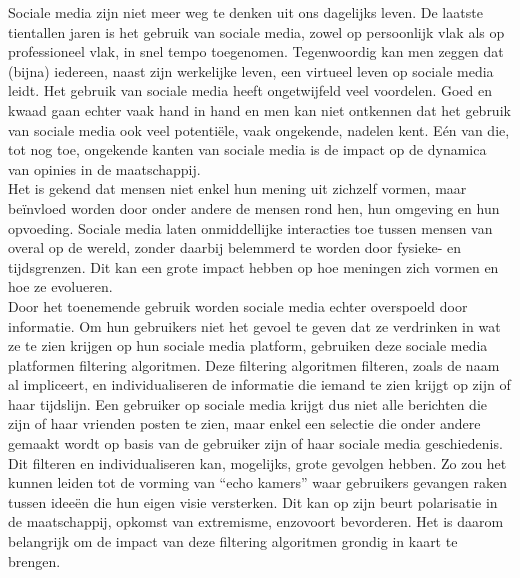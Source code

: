 \documentclass[11 pt , letterpaper , twoside , openright]{book}
\newenvironment{abstract}%
{\cleardoublepage\null \vfill\begin{center}\bfseries \abstractname \end{center}}{\vfill\null}
\begin{document}

\begin{abstract}
\thispagestyle{plain}
\setcounter{page}{\value{abstractpage}}

\noindent
Sociale media zijn niet meer weg te denken uit ons dagelijks leven. De laatste tientallen jaren is het gebruik van sociale media, zowel op persoonlijk vlak als op professioneel vlak, in snel tempo toegenomen. Tegenwoordig kan men zeggen dat (bijna) iedereen, naast zijn werkelijke leven, een virtueel leven op sociale media leidt. Het gebruik van sociale media heeft ongetwijfeld veel voordelen. Goed en kwaad gaan echter vaak hand in hand en men kan niet ontkennen dat het gebruik van sociale media ook veel potentiële, vaak ongekende, nadelen kent. Eén van die, tot nog toe, ongekende kanten van sociale media is de impact op de dynamica van opinies in de maatschappij. \\
\newline
Het is gekend dat mensen niet enkel hun mening uit zichzelf vormen, maar beïnvloed worden door onder andere de mensen rond hen, hun omgeving en hun opvoeding. Sociale media laten onmiddellijke interacties toe tussen mensen van overal op de wereld, zonder daarbij belemmerd te worden door fysieke- en tijdsgrenzen. Dit kan een grote impact hebben op hoe meningen zich vormen en hoe ze evolueren.\\
\newline
Door het toenemende gebruik worden sociale media echter overspoeld door informatie. Om hun gebruikers niet het gevoel te geven dat ze verdrinken in wat ze te zien krijgen op hun sociale media platform, gebruiken deze sociale media platformen filtering algoritmen. Deze filtering algoritmen filteren, zoals de naam al impliceert, en individualiseren de informatie die iemand te zien krijgt op zijn of haar tijdslijn. Een gebruiker op sociale media krijgt dus niet alle berichten die zijn of haar vrienden posten te zien, maar enkel een selectie die onder andere gemaakt wordt op basis van de gebruiker zijn of haar sociale media geschiedenis. Dit filteren en individualiseren kan, mogelijks, grote gevolgen hebben. Zo zou het kunnen leiden tot de vorming van ``echo kamers'' waar gebruikers gevangen raken tussen ideeën die hun eigen visie versterken. Dit kan op zijn beurt polarisatie in de maatschappij, opkomst van extremisme, enzovoort bevorderen. Het is daarom belangrijk om de impact van deze filtering algoritmen grondig in kaart te brengen.\\

\end{abstract}
\end{document}

